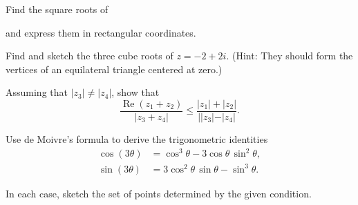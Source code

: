 \documentclass[11pt]{exam}
\newcommand{\ds}{\displaystyle}
\DeclareMathOperator{\re}{Re}
\DeclareMathOperator{\im}{Im}
\begin{document}
\begin{questions}

\question Find the square roots of
and express them in rectangular coordinates.

\question Find and sketch the three cube roots of $z=-2+2i$. (Hint:
They should form the vertices of an equilateral triangle centered at
zero.)

\question Assuming that $|z_3| \ne |z_4|$, show that
\[
  \frac{ \re(z_1+z_2)}{|z_3+z_4|} \le \frac{|z_1| +
    |z_2|}{||z_3|-|z_4|}.
\]

\question Use de Moivre's formula to derive the trigonometric
identities
\begin{align*}
  \cos (3\theta) &= \cos^3 \theta - 3 \cos \theta \, \sin^2 \theta, \\
  \sin (3\theta) &= 3 \cos^2 \theta \, \sin \theta -  \sin^3 \theta.
\end{align*}

\question In each case, sketch the set of points determined by the
given condition.
\end{questions}
\end{document}
